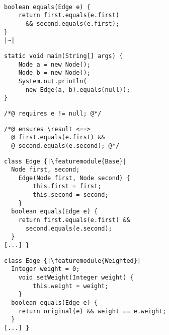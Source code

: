 \newsavebox{\callee}
\begin{lrbox}{\callee}
\begin{lstlisting}

boolean equals(Edge e) {
	return first.equals(e.first)
	  && second.equals(e.first);
}
|~|
\end{lstlisting}
\end{lrbox}

\newsavebox{\caller}
\begin{lrbox}{\caller}
\begin{lstlisting}
static void main(String[] args) {
	Node a = new Node();
	Node b = new Node();
	System.out.println(
	  new Edge(a, b).equals(null));
}
\end{lstlisting}
\end{lrbox}

\newsavebox{\blamepre}
\begin{lrbox}{\blamepre}
\begin{lstlisting}
/*@ requires e != null; @*/
\end{lstlisting}
\end{lrbox}

\newsavebox{\blamepost}
\begin{lrbox}{\blamepost}
\begin{lstlisting}
/*@ ensures \result <==>
  @ first.equals(e.first) &&
  @ second.equals(e.second); @*/
\end{lstlisting}
\end{lrbox}


\newsavebox{\fopbase}
\begin{lrbox}{\fopbase}
	\begin{minipage}{72mm}
\begin{lstlisting}
class Edge {|\featuremodule{Base}|
  Node first, second;
	Edge(Node first, Node second) {
		this.first = first;
		this.second = second;
	}
  boolean equals(Edge e) {
    return first.equals(e.first) &&
      second.equals(e.second);
  }
[...] }
\end{lstlisting}
	\end{minipage}
\end{lrbox}

\newsavebox{\fopweight}
\begin{lrbox}{\fopweight}
	\begin{minipage}{72mm}
\begin{lstlisting}
class Edge {|\featuremodule{Weighted}|
  Integer weight = 0;
	void setWeight(Integer weight) {
		this.weight = weight;
	}
  boolean equals(Edge e) {
    return original(e) && weight == e.weight;
  }
[...] }
\end{lstlisting}
	\end{minipage}
\end{lrbox}

